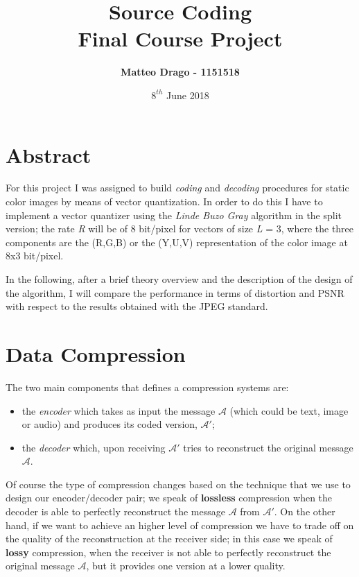 \documentclass{report}
\newcommand{\hmwkTitle}{Final Course Project} %
\newcommand{\hmwkClass}{Source Coding} %
\newcommand{\hmwkAuthorName}{Matteo Drago - 1151518} %
\begin{document}
\title{
\vspace{2in}
\textmd{\textbf{\hmwkClass \\ \hmwkTitle}}\\
\vspace{3in}
}
\author{\textbf{\hmwkAuthorName}}
\date{$8^{th}$ June 2018} %



\maketitle
{} %
\setcounter{page}{1}

\section{Abstract}
For this project I was assigned to build \textit{coding} and \textit{decoding} procedures for static color images by means of vector quantization. In order to do this I have to implement a vector quantizer using the \textit{Linde Buzo Gray} algorithm in the split version; the rate \textit{R} will be of 8 bit/pixel for vectors of size \textit{L} = 3, where the three components are the (R,G,B) or the (Y,U,V) representation of the color image at 8x3 bit/pixel.

In the following, after a brief theory overview and the description of the design of the algorithm, I will compare the performance in terms of distortion and PSNR with respect to the results obtained with the JPEG standard.

\section{Data Compression}
The two main components that defines a compression systems are:
\begin{itemize}
	\item the \textit{encoder} which takes as input the message $\mathcal{A}$ (which could be text, image or audio) and produces its coded version, $\mathcal{A}'$;
	\item the \textit{decoder} which, upon receiving $\mathcal{A}'$ tries to reconstruct the original message $\mathcal{A}$.
\end{itemize}   
Of course the type of compression changes based on the technique that we use to design our encoder/decoder pair; we speak of \textbf{lossless} compression when the decoder is able to perfectly reconstruct the message $\mathcal{A}$ from $\mathcal{A}'$. On the other hand, if we want to achieve an higher level of compression we have to trade off on the quality of the reconstruction at the receiver side; in this case we speak of \textbf{lossy} compression, when the receiver is not able to perfectly reconstruct the original message $\mathcal{A}$, but it provides one version at a lower quality.
\end{document}
